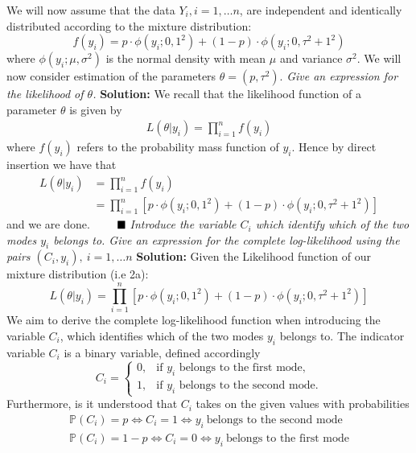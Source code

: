 We will now assume that the data $Y_i, i=1, \ldots n$, are independent and identically distributed according to the mixture distribution:
$$
f\left(y_i\right)=p \cdot \phi\left(y_i ; 0,1^2\right)+(1-p) \cdot \phi\left(y_i ; 0, \tau^2+1^2\right)
$$
where $\phi\left(y_i ; \mu, \sigma^2\right)$ is the normal density with mean $\mu$ and variance $\sigma^2$. We will now consider estimation of the parameters $\theta=\left(p, \tau^2\right)$.
\emph{Give an expression for the likelihood of $\theta$.} \spaze
\textbf{Solution:} \spaze
We recall that the likelihood function of a parameter $\theta$ is given by 
\begin{align}
    L(\theta| y_i) =\prod_{i=1}^{n} f(y_i) 
\end{align}
where $f(y_i)$ refers to the probability mass function of $y_i$. Hence by direct insertion we have that 
\begin{align*}
     L(\theta| y_i) &=\prod_{i=1}^{n} f(y_i)  \\[5pt]
     &= \prod_{i=1}^{n} \left[ p \cdot \phi\left(y_i ; 0,1^2\right)+(1-p) \cdot \phi\left(y_i ; 0, \tau^2+1^2\right) \right]
\end{align*}
and we are done. $\Q$
\emph{Introduce the variable $C_i$ which identify which of the two modes $y_i$ belongs to. Give an expression for the complete log-likelihood using the pairs $\left(C_i, y_i\right), \ i=1, \ldots n$} \spaze
\textbf{Solution:} \spaze
Given the Likelihood function of our mixture distribution (i.e 2a):
\[
L(\theta| y_i) = \prod_{i=1}^{n} \left[ p \cdot \phi\left(y_i ; 0,1^2\right)+(1-p) \cdot \phi\left(y_i ; 0, \tau^2+1^2\right) \right]
\]
We aim to derive the complete log-likelihood function when introducing the variable \( C_i \), which identifies which of the two modes \( y_i \) belongs to. The indicator variable \(C_i\) is a binary variable, defined accordingly
\[
C_i = 
\begin{cases}
0, & \text{if } y_i \text{ belongs to the first mode,} \\
1, & \text{if } y_i \text{ belongs to the second mode.}
\end{cases}
\]
Furthermore, is it understood that $C_i$ takes on the given values with probabilities
\begin{align*}
    \mathbb{P}(C_i) = p \iff C_i = 1 \iff y_i \ \text{belongs to the second mode} \\[5pt]
    \mathbb{P}(C_i) = 1-p \iff C_i = 0 \iff y_i \ \text{belongs to the first mode}
\end{align*}
